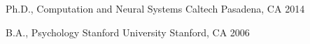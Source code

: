
\begin{cventries}

  \cventry
    {Ph.D., Computation and Neural Systems}
    {Caltech}
    {Pasadena, CA}
    {2014}
    {}

  \cventry
    {B.A., Psychology}
    {Stanford University}
    {Stanford, CA}
    {2006}
    {}

\end{cventries}